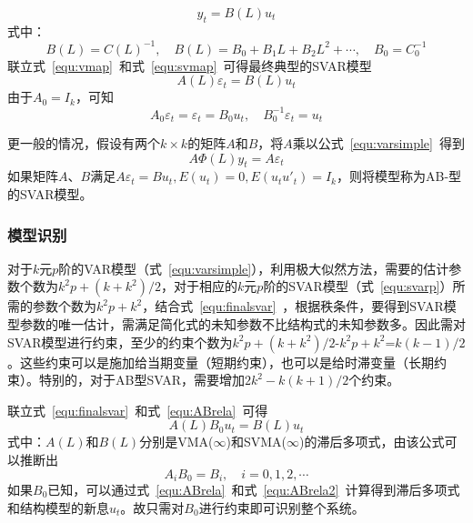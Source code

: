 \begin{equation}
	\label{equ:svmap}
	{{y}_{t}}=B(L){{u}_{t}}
\end{equation}
式中：
\begin{equation}
	B(L)=C{{(L)}^{-1}},\quad B(L)={{B}_{0}}+{{B}_{1}}L+{{B}_{2}}{{L}^{2}}+\cdots ,\quad {{B}_{0}}=C_{0}^{-1}
\end{equation}
联立式~\ref{equ:vmap}~和式~\ref{equ:svmap}~可得最终典型的SVAR模型
\begin{equation}
	\label{equ:finalsvar}
	A(L){\varepsilon }_{t}=B(L){u}_{t}
\end{equation}
由于$A_0=I_k$，可知
\begin{equation}
	\label{equ:ABrela}
	{A}_{0}{\varepsilon }_{t}={\varepsilon }_{t}={B_0}{u_t},\quad {B}_0^{-1}{\varepsilon }_{t}=u_t
\end{equation}

更一般的情况，假设有两个$k\times k$的矩阵$A$和$B$，将$A$乘以公式~\ref{equ:varsimple}~得到
\begin{equation}
	\label{equ:svarab}
	A{\Phi }(L)y_t=A{\varepsilon }_{t}
\end{equation}
如果矩阵$A$、$B$满足$A{\varepsilon }_{t}=Bu_t,E(u_t)=0,E(u_tu'_t)=I_k$，则将模型称为AB-型的SVAR模型。

\subsubsection{模型识别}

对于$k$元$p$阶的VAR模型（式~\ref{equ:varsimple}），利用极大似然方法，需要的估计参数个数为$k^2p+(k+k^2)/2$，对于相应的$k$元$p$阶的SVAR模型（式~\ref{equ:svarp}）所需的参数个数为$k^2p+k^2$，结合式~\ref{equ:finalsvar}~，根据秩条件，要得到SVAR模型参数的唯一估计，需满足简化式的未知参数不比结构式的未知参数多。因此需对SVAR模型进行约束，至少的约束个数为$k^2p+(k+k^2)/2$-$k^2p+k^2$=$k(k-1)/2$。这些约束可以是施加给当期变量（短期约束），也可以是给时滞变量（长期约束）。特别的，对于AB型SVAR，需要增加$2k^2-k(k+1)/2$个约束。

联立式~\ref{equ:finalsvar}~和式~\ref{equ:ABrela}~可得
\begin{equation}
	A(L)B_0u_t=B(L)u_t
\end{equation}
式中：$A(L)$和$B(L)$分别是VMA($\infty $)和SVMA($\infty $)的滞后多项式，由该公式可以推断出
\begin{equation}
	\label{equ:ABrela2}
	A_iB_0=B_i, \quad i=0,1,2,\cdots
\end{equation}
如果$B_0$已知，可以通过式~\ref{equ:ABrela}~和式~\ref{equ:ABrela2}~计算得到滞后多项式和结构模型的新息$u_t$。故只需对$B_0$进行约束即可识别整个系统。

